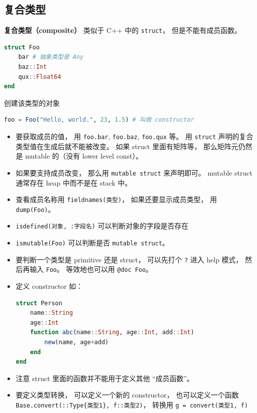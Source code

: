 \subsection{复合类型}
\textbf{复合类型（composite）} 类似于 C++ 中的 \verb`struct`， 但是不能有成员函数。
\begin{lstlisting}[language=julia]
struct Foo
    bar # 抽象类型是 Any
    baz::Int
    qux::Float64
end
\end{lstlisting}
创建该类型的对象
\begin{lstlisting}[language=julia]
foo = Foo("Hello, world.", 23, 1.5) # 叫做 constructor
\end{lstlisting}
\begin{itemize}
\item 要获取成员的值， 用 \verb`foo.bar`, \verb`foo.baz`, \verb`foo.qux` 等。 用 \verb`struct` 声明的复合类型值在生成后就不能被改变。 如果 struct 里面有矩阵等， 那么矩阵元仍然是 mutable 的（没有 lower level const）。
\item 如果要支持成员改变， 那么用 \verb`mutable struct` 来声明即可。 mutable struct 通常存在 heap 中而不是在 stack 中。
\item 查看成员名称用 \verb`fieldnames(类型)`， 如果还要显示成员类型， 用 \verb`dump(Foo)`。
\item \verb`isdefined(对象, :字段名)` 可以判断对象的字段是否存在
\item \verb`ismutable(Foo)` 可以判断是否 \verb`mutable struct`。
\item 要判断一个类型是 primitive 还是 struct， 可以先打个 \verb`?` 进入 help 模式， 然后再输入 \verb`Foo`。 等效地也可以用 \verb`@doc Foo`。
\item 定义 constructor 如：
\begin{lstlisting}[language=julia]
struct Person
    name::String
    age::Int
    function abc(name::String, age::Int, add::Int)
        new(name, age+add)
    end
end
\end{lstlisting}
\item 注意 struct 里面的函数并不能用于定义其他 “成员函数”。
\item 要定义类型转换， 可以定义一个新的 constructor， 也可以定义一个函数 \verb`Base.convert(::Type{类型1}, f::类型2)`， 转换用 \verb`g = convert(类型1, f)`
\end{itemize}

